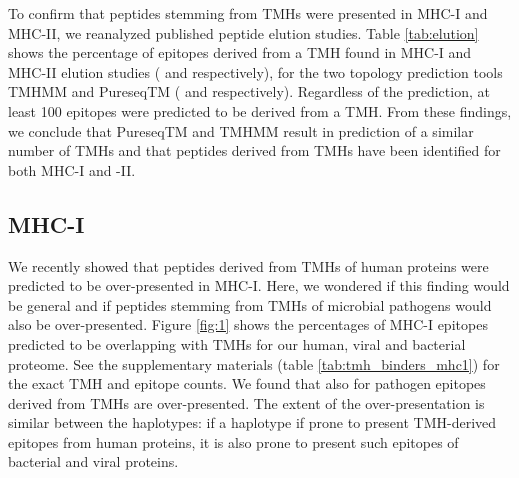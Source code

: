 To confirm that peptides stemming from TMHs were presented in MHC-I and MHC-II,
we reanalyzed published peptide elution studies.
Table \ref{tab:elution} shows the percentage of epitopes derived 
from a TMH
found in MHC-I and MHC-II elution 
studies (\cite{schellens2015comprehensive} and \cite{bergseng2015different} respectively), 
for the two topology prediction tools TMHMM and 
PureseqTM (\cite{krogh2001predicting} and \cite{wang2019efficient} respectively). 
Regardless of the prediction, 
at least 100 epitopes were predicted to be derived from a TMH. 
From these findings, we conclude that PureseqTM and TMHMM 
result in prediction of a similar number of TMHs 
and that peptides derived from TMHs have been identified for both MHC-I and -II.

\subsection{MHC-I}

We recently showed that peptides derived from TMHs of human proteins 
were predicted to be over-presented in MHC-I. 
Here, we wondered if this finding would be general 
and if peptides stemming from TMHs of microbial pathogens 
would also be over-presented.
Figure \ref{fig:1} shows the percentages of MHC-I epitopes predicted to be overlapping 
with TMHs for our human, viral and bacterial proteome.
See the supplementary materials (table \ref{tab:tmh_binders_mhc1}) 
for the exact TMH and epitope counts.
We found that also for pathogen epitopes derived from TMHs are
over-presented. 
The extent of the over-presentation is similar between the haplotypes:
if a haplotype if prone to present TMH-derived epitopes from
human proteins, it is also prone to present such epitopes of
bacterial and viral proteins.

